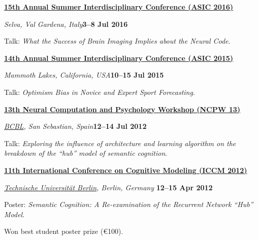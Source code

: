 \documentclass[10pt]{article}
\newenvironment{outerlist}[1][\enskip\textbullet]%
        {\begin{itemize}[#1]}{\end{itemize}%
         \vspace{-.6\baselineskip}}
\newenvironment{innerlist}[1][\enskip\textbullet]%
        {\begin{compactitem}[#1]}{\end{compactitem}}
\begin{document}
\textbf{\href{http://www.cogs.indiana.edu/asic/2016/index.shtml}{15th Annual Summer Interdisciplinary Conference (ASIC 2016)}}
\begin{outerlist}
\item[] \textit{Selva, Val Gardena, Italy}\hfill\textbf{3--8 Jul 2016}
\begin{innerlist}
\item Talk: \textit{What the Success of Brain Imaging Implies about the Neural Code}.
\end{innerlist}
\end{outerlist}
\vspace{10pt}

\textbf{\href{http://www.cogs.indiana.edu/asic/2015/index.shtml}{14th Annual Summer Interdisciplinary Conference (ASIC 2015)}}
\begin{outerlist}
\item[] \textit{Mammoth Lakes, California, USA}\hfill\textbf{10--15 Jul 2015}
\begin{innerlist}
\item Talk: \textit{Optimism Bias in Novice and Expert Sport Forecasting}.
\end{innerlist}
\end{outerlist}
\vspace{10pt}

\textbf{\href{http://www.bcbl.eu/events/ncpw13/}{13th Neural Computation and Psychology Workshop (NCPW 13)}}
\begin{outerlist}
\item[] \textit{\href{http://www.bcbl.eu/}{BCBL}, San Sebastian, Spain}\hfill\textbf{12--14 Jul 2012}
\begin{innerlist}
\item Talk: \textit{Exploring the influence of architecture and learning algorithm on the breakdown of the ``hub'' model of semantic cognition}.
\end{innerlist}
\end{outerlist}
\vspace{10pt}

\textbf{\href{http://iccm-conference.org/2012/}{11th International Conference on Cognitive Modeling (ICCM 2012)}}
\begin{outerlist}
\item[] \textit{\href{http://www.tu-berlin.de/menue/home/parameter/en/}{Technische Universit\"{a}t Berlin}, Berlin, Germany}
        \hfill \textbf{12--15 Apr 2012}
\begin{innerlist}
\item Poster: \textit{Semantic Cognition: A Re-examination of the Recurrent Network ``Hub'' Model}.
\item Won best student poster prize (\euro 100).
\end{innerlist}
\end{outerlist}
\end{document}
